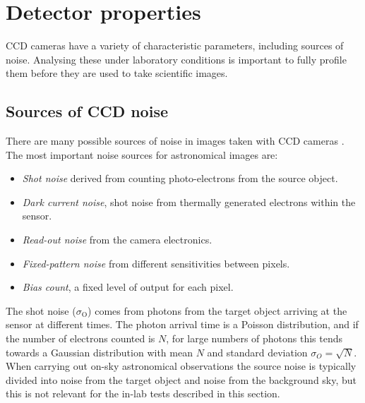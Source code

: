 \section{Detector properties}
\label{sec:detectors}
\begin{colsection}


\begin{colsection}

CCD cameras have a variety of characteristic parameters, including sources of noise. Analysing these under laboratory conditions is important to fully profile them before they are used to take scientific images.

\end{colsection}

\subsection{Sources of CCD noise}
\label{sec:CCD_noise}
\begin{colsection}

There are many possible sources of noise in images taken with CCD cameras \citep{CCDs}. The most important noise sources for astronomical images are:

\begin{itemize}
    \item \emph{Shot noise} derived from counting photo-electrons from the source object.
    \item \emph{Dark current noise}, shot noise from thermally generated electrons within the sensor.
    \item \emph{Read-out noise} from the camera electronics.
    \item \emph{Fixed-pattern noise} from different sensitivities between pixels.
    \item \emph{Bias count}, a fixed level of output for each pixel.
\end{itemize}

The shot noise ($\sigma_\text{O}$) comes from photons from the target object arriving at the sensor at different times. The photon arrival time is a Poisson distribution, and if the number of electrons counted is $N$, for large numbers of photons this tends towards a Gaussian distribution with mean $N$ and standard deviation $\sigma_O = \sqrt{N}$. When carrying out on-sky astronomical observations the source noise is typically divided into noise from the target object and noise from the background sky, but this is not relevant for the in-lab tests described in this section.


\end{colsection}
\end{colsection}
